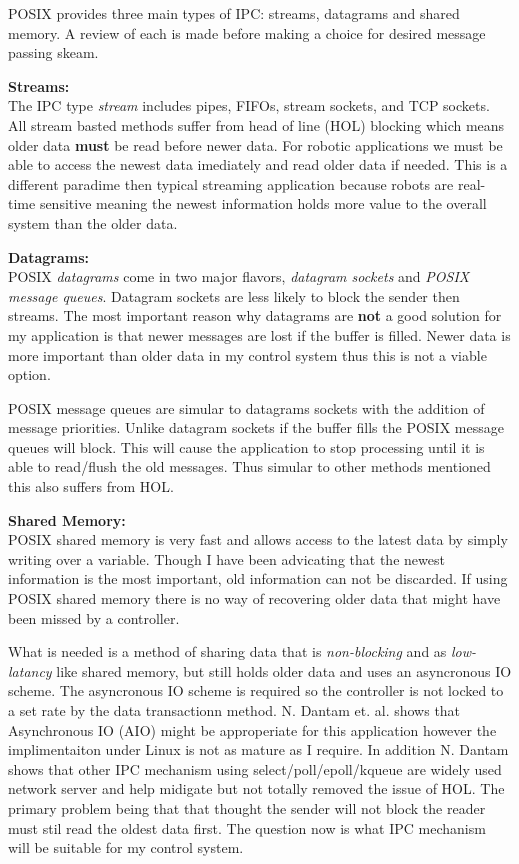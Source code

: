 POSIX provides three main types of IPC: streams, datagrams and shared memory.  
A review of each is made before making a choice for desired message passing skeam.

\noindent \textbf{Streams:}\\
The IPC type \textit{stream} includes pipes, FIFOs, stream sockets, and TCP sockets.
All stream basted methods suffer from head of line (HOL) blocking which means older data \textbf{must} be read before newer data.
For robotic applications we must be able to access the newest data imediately and read older data if needed.
This is a different paradime then typical streaming application because robots are real-time sensitive meaning the newest information holds more value to the overall system than the older data.

\noindent \textbf{Datagrams:}\\
POSIX \textit{datagrams} come in two major flavors, \textit{datagram sockets} and \textit{POSIX message queues}.
Datagram sockets are less likely to block the sender then streams.
The most important reason why datagrams are \textbf{not} a good solution for my application is that newer messages are lost if the buffer is filled.
Newer data is more important than older data in my control system thus this is not a viable option.

POSIX message queues are simular to datagrams sockets with the addition of message priorities.
Unlike datagram sockets if the buffer fills the POSIX message queues will block.
This will cause the application to stop processing until it is able to read/flush the old messages.
Thus simular to other methods mentioned this also suffers from HOL.

\noindent \textbf{Shared Memory:}\\
POSIX shared memory is very fast and allows access to the latest data by simply writing over a variable.
Though I have been advicating that the newest information is the most important, old information can not be discarded.
If using POSIX shared memory there is no way of recovering older data that might have been missed by a controller.

What is needed is a method of sharing data that is \textit{non-blocking} and as \textit{low-latancy} like shared memory, but still holds older data and uses an asyncronous IO scheme.
The asyncronous IO scheme is required so the controller is not locked to a set rate by the data transactionn method.
N. Dantam et. al.\cite{ach} shows that Asynchronous IO (AIO) might be approperiate for this application however the implimentaiton under Linux is not as mature as I require.
In addition N. Dantam shows that other IPC mechanism using select/poll/epoll/kqueue are widely used network server and help midigate but not totally removed the issue of HOL.
The primary problem being that that thought the sender will not block the reader must stil read the oldest data first.
The question now is what IPC mechanism will be suitable for my control system.



